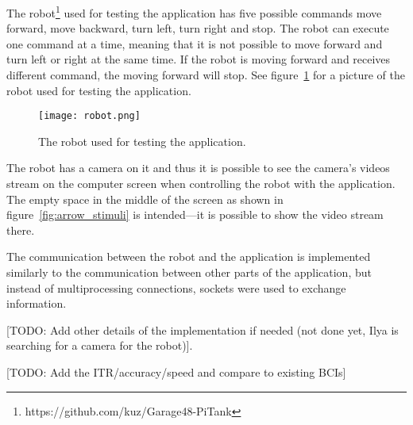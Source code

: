 The robot\footnote{https://github.com/kuz/Garage48-PiTank} used for testing the application has five possible commands move forward, move backward, turn left, turn right and stop. The robot can execute one command at a time, meaning that it is not possible to move forward and turn left or right at the same time. If the robot is moving forward and receives different command, the moving forward will stop. See figure~\ref{fig:robot} for a picture of the robot used for testing the application.

\begin{figure}[h]
	\centering
	\texttt{[image: robot.png]}
	\caption{The robot used for testing the application.}
	\label{fig:robot}
\end{figure}

The robot has a camera on it and thus it is possible to see the camera's videos stream on the computer screen when controlling the robot with the application. The empty space in the middle of the screen as shown in figure~\ref{fig:arrow_stimuli} is intended---it is possible to show the video stream there.

The communication between the robot and the application is implemented similarly to the communication between other parts of the application, but instead of multiprocessing connections, sockets were used to exchange information.

[TODO: Add other details of the implementation if needed (not done yet, Ilya is searching for a camera for the robot)].

[TODO: Add the ITR/accuracy/speed and compare to existing BCIs]
